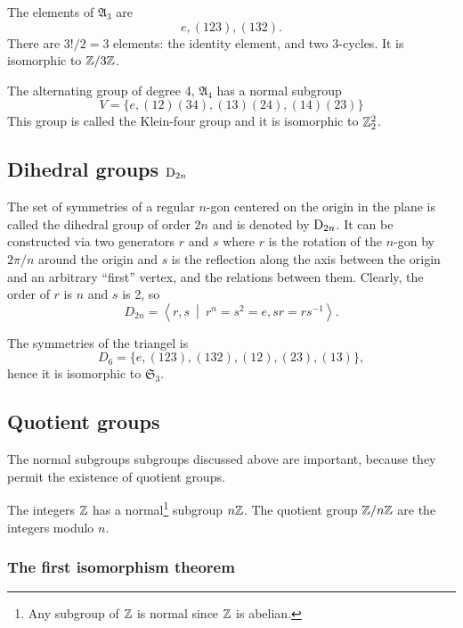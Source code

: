 \begin{example}
The elements of $\mathfrak{A}_3$ are 
\[
e,(123),(132).
\]
There are $3!/2=3$ elements: the identity element, and two 3-cycles. It is isomorphic to $\mathbb{Z}/3\mathbb{Z}$.
\end{example}

\begin{example}
The alternating group of degree 4, $\mathfrak{A}_4$ has a normal subgroup
\[
V =\{e,(12)(34),(13)(24),(14)(23)\}
\]
This group is called the Klein-four group and it is isomorphic to $\mathbb{Z}_2^2$.
\end{example}

\subsection{Dihedral groups $\text{D}_{2n}$}

The set of symmetries of a regular $n$-gon centered on the origin in the plane is called the dihedral group of order $2n$ and is denoted by $\text{D}_{2n}$. It can be constructed via two generators $r$ and $s$ where $r$ is the rotation of the $n$-gon by $2\pi/n$ around the origin and $s$ is the reflection along the axis between the origin and an arbitrary ``first'' vertex, and the relations between them. Clearly, the order of $r$ is $n$ and $s$ is 2, so
\[
D_{2n} = \left\langle r,s \ \middle\vert \ r^n = s^2 = e, sr = rs^{-1} \right\rangle.
\] 

\begin{example}
The symmetries of the triangel is
\[
D_6 = \{ e, (123), (132), (12), (23), (13) \},
\]
hence it is isomorphic to $\mathfrak{S}_3$.
\end{example}

\subsection{Quotient groups}

The normal subgroups subgroups discussed above are important, because they permit the existence of quotient groups.

\begin{example}
The integers $\mathbb{Z}$ has a normal\footnote{Any subgroup of $\mathbb{Z}$ is normal since $\mathbb{Z}$ is abelian.} subgroup $n\mathbb{Z}$. The quotient group $\mathbb{Z}/n\mathbb{Z}$ are the integers modulo $n$.
\end{example}

\subsubsection{The first isomorphism theorem}

